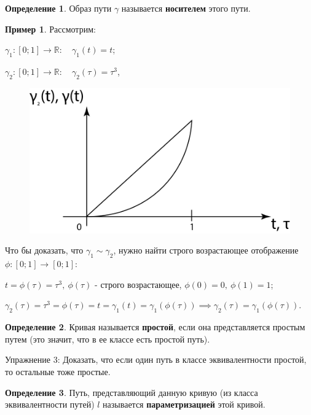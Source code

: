 \documentclass{report}
\theoremstyle{definition}
\newtheorem{definition}{Определение}[section]
\newtheorem{example}{Пример}
\begin{document}
\begin{definition}
  Образ пути $\gamma$ называется \textbf{носителем} этого пути.
\end{definition}

\begin{example}
  Рассмотрим:

  $\gamma_1: [0;1] \rightarrow \mathbb{R}: \quad \gamma_1(t) = t$;

  $\gamma_2: [0;1] \rightarrow \mathbb{R}: \quad \gamma_2(\tau) = \tau^3$,

  \begin{figure}[H]
    \begin{center}
      \includegraphics[scale=0.2]{graph8.png}\label{figure8}
    \end{center}
  \end{figure}

  Что бы доказать, что $\gamma_1 \sim \gamma_2$, нужно найти строго возрастающее отображение
  $\phi:[0;1]\rightarrow[0;1]$:

  $t = \phi(\tau) = \tau^3, \ \phi(\tau)$ - строго возрастающее, $\phi(0) = 0, \ \phi(1) = 1$;

  $\gamma_2(\tau) = \tau^3 = \phi(\tau) = t = \gamma_1(t) = \gamma_1(\phi(\tau)) \implies
    \gamma_2(\tau) = \gamma_1(\phi(\tau))$.
\end{example}

\begin{definition}
  Кривая называется \textbf{простой}, если она представляется простым путем (это значит, что в ее классе
  есть простой путь).
\end{definition}

Упражнение 3: Доказать, что если один путь в классе эквивалентности простой, то остальные тоже простые.

\begin{definition}
  Путь, представляющий данную кривую (из класса эквивалентности путей) $l$ называется
  \textbf{параметризацией} этой кривой.
\end{definition}
\end{document}
